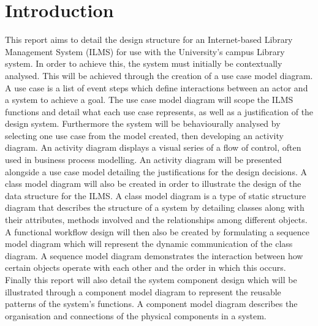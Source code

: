 \chapter{Introduction}

This report aims to detail the design structure for an Internet-based Library Management System (ILMS) for use with the University's campus Library system.  In order to achieve this, the system must initially be contextually analysed. This will be achieved through the creation of a use case model diagram. A use case is a list of event steps which define interactions between an actor and a system to achieve a goal. The use case model diagram will scope the ILMS functions and detail what each use case represents, as well as a justification of the design system. Furthermore the system will be behaviourally analysed by selecting one use case from the model created, then developing an activity diagram. An activity diagram displays a visual series of a flow of control, often used in business process modelling.  An activity diagram will be presented alongside a use case model detailing the justifications for the design decisions. A class model diagram will also be created in order to illustrate the design of the data structure for the ILMS. A class model diagram is a type of static structure diagram that describes the structure of a system by detailing classes along with their attributes, methods involved and the relationships among different objects. A functional workflow design will then also be created by formulating a sequence model diagram which will represent the dynamic communication of the class diagram. A sequence model diagram demonstrates the interaction between how certain objects operate with each other and the order in which this occurs. Finally this report will also detail the system component design which will be illustrated through a component model diagram to represent the reusable patterns of the system's functions. A component model diagram describes the organisation and connections of the physical components in a system.